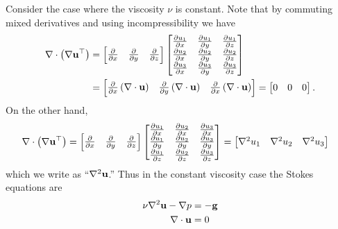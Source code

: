 Consider the case where the viscosity $\nu$ is constant.  Note that by commuting mixed derivatives and using incompressibility we have
\begin{align*}
\nabla\cdot \left(\nabla \mathbf{u}^{\top}\right) &= \begin{bmatrix}
    \frac{\partial}{\partial x} & \frac{\partial}{\partial y} & \frac{\partial}{\partial z}
    \end{bmatrix}
    \begin{bmatrix}
    \frac{\partial u_1}{\partial x} & \frac{\partial u_1}{\partial y} & \frac{\partial u_1}{\partial z} \\
    \frac{\partial u_2}{\partial x} & \frac{\partial u_2}{\partial y} & \frac{\partial u_2}{\partial z} \\
    \frac{\partial u_3}{\partial x} & \frac{\partial u_3}{\partial y} & \frac{\partial u_3}{\partial z}
    \end{bmatrix} \\
  &= \begin{bmatrix}
    \frac{\partial}{\partial x}\left(\nabla\cdot \mathbf{u}\right) & \frac{\partial}{\partial y }\left(\nabla\cdot \mathbf{u}\right) & \frac{\partial}{\partial x} \left(\nabla\cdot \mathbf{u}\right)
    \end{bmatrix}
    = \begin{bmatrix} 0 & 0 & 0 \end{bmatrix}.
\end{align*}
On the other hand,
\begin{align*}
\nabla\cdot \left(\nabla \mathbf{u}^{\top}\right) &= \begin{bmatrix}
    \frac{\partial}{\partial x} & \frac{\partial}{\partial y} & \frac{\partial}{\partial z}
    \end{bmatrix}
    \begin{bmatrix}
    \frac{\partial u_1}{\partial x} & \frac{\partial u_2}{\partial x} & \frac{\partial u_3}{\partial x} \\
    \frac{\partial u_1}{\partial y} & \frac{\partial u_2}{\partial y} & \frac{\partial u_3}{\partial y} \\
    \frac{\partial u_1}{\partial z} & \frac{\partial u_2}{\partial z} & \frac{\partial u_3}{\partial z}
    \end{bmatrix}
    = \begin{bmatrix} \nabla^2 u_1 & \nabla^2 u_2 & \nabla^2 u_3 \end{bmatrix}
\end{align*}
which we write as ``$\nabla^2 \mathbf{u}$.''  Thus in the constant viscosity case the Stokes equations are
\begin{align}
\nu \nabla^2 \mathbf{u} - \nabla p &= - \mathbf{g} \\
\nabla\cdot \mathbf{u} &= 0
\end{align}

